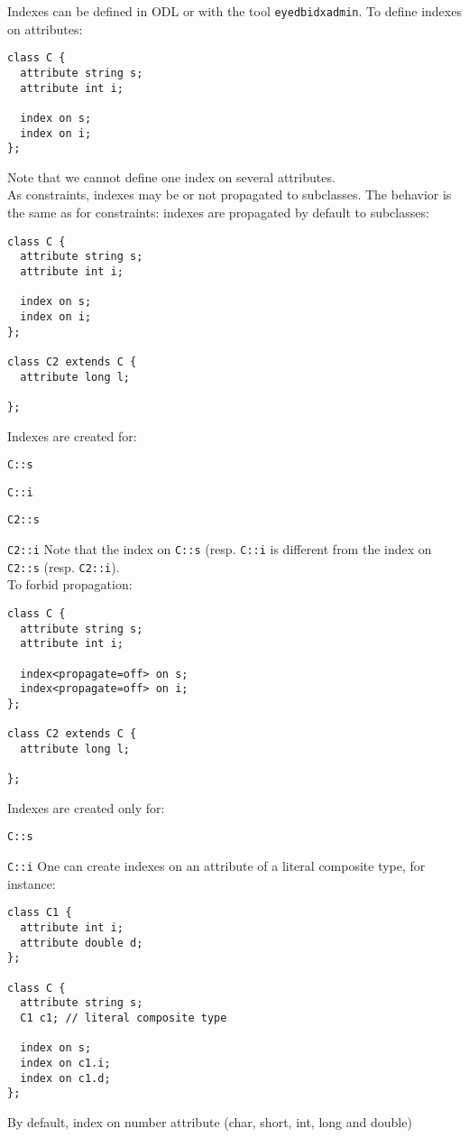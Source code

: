 Indexes can be defined in ODL or with the tool \texttt{eyedbidxadmin}.
To define indexes on attributes:
\begin{verbatim}
class C {
  attribute string s;
  attribute int i;

  index on s;
  index on i;
};
\end{verbatim}
Note that we cannot define one index on several attributes.
\\
As constraints, indexes may be or not propagated to subclasses.
The behavior is the same as for constraints: indexes are propagated
by default to subclasses:
\begin{verbatim}
class C {
  attribute string s;
  attribute int i;

  index on s;
  index on i;
};

class C2 extends C {
  attribute long l;
  
};
\end{verbatim}
Indexes are created for:
\be
\item \texttt{C::s}
\item \texttt{C::i}
\item \texttt{C2::s}
\item \texttt{C2::i}
\ee
Note that the index on \texttt{C::s} (resp. \texttt{C::i} is different from the
index on \texttt{C2::s} (resp. \texttt{C2::i}).
\\
To forbid propagation:
\begin{verbatim}
class C {
  attribute string s;
  attribute int i;

  index<propagate=off> on s;
  index<propagate=off> on i;
};

class C2 extends C {
  attribute long l;
  
};
\end{verbatim}
Indexes are created only for:
\be
\item \texttt{C::s}
\item \texttt{C::i}
\ee
{}
One can create indexes on an attribute of a literal composite type, for
instance:
\begin{verbatim}
class C1 {
  attribute int i;
  attribute double d;
};

class C {
  attribute string s;
  C1 c1; // literal composite type

  index on s;
  index on c1.i;
  index on c1.d;
};
\end{verbatim}
By default, index on number attribute (char, short, int, long and double)
